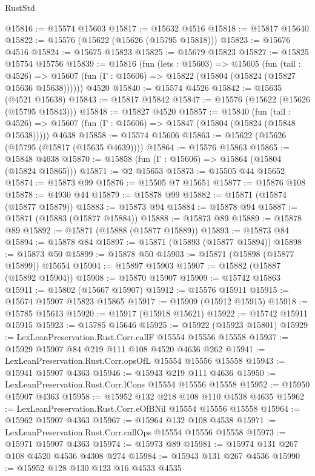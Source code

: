 \begin{lexlean}{RustStd}
\begin{coremodule}
@15816 := @15574 @15603
@15817 := @15632 @4516
@15818 := @15817 @15640
@15822 := @15576 (@15622 (@15626 (@15795 @15818)))
@15823 := @15676 @4516
@15824 := @15675 @15823
@15825 := @15679 @15823
@15827 := @15825 @15754 @15756
@15839 := @15816
    (fun (lets : @15603) =>
    @15605
      (fun (tail : @4526) =>
      @15607 (fun (Γ : @15606) => @15822 (@15804 (@15824 (@15827 @15636 @15638))))))
    @4520
@15840 := @15574 @4526
@15842 := @15635 (@4521 @15638)
@15843 := @15817 @15842
@15847 := @15576 (@15622 (@15626 (@15795 @15843)))
@15848 := @15827 @4520
@15857 := @15840
    (fun (tail : @4526) => @15607 (fun (Γ : @15606) => @15847 (@15804 (@15824 (@15848 @15638)))))
    @4638
@15858 := @15574 @15606
@15863 := @15622 (@15626 (@15795 (@15817 (@15635 @4639))))
@15864 := @15576 @15863
@15865 := @15848 @4638
@15870 := @15858 (fun (Γ : @15606) => @15864 (@15804 (@15824 @15865)))
@15871 := @2 @15653
@15873 := @15505 @44 @15652
@15874 := @15873 @99
@15876 := @15505 @7 @15651
@15877 := @15876 @108
@15878 := @4930 @44
@15879 := @15878 @99
@15882 := @15871 (@15874 (@15877 @15879))
@15883 := @15873 @94
@15884 := @15878 @94
@15887 := @15871 (@15883 (@15877 @15884))
@15888 := @15873 @89
@15889 := @15878 @89
@15892 := @15871 (@15888 (@15877 @15889))
@15893 := @15873 @84
@15894 := @15878 @84
@15897 := @15871 (@15893 (@15877 @15894))
@15898 := @15873 @50
@15899 := @15878 @50
@15903 := @15871 (@15898 (@15877 @15899)) @15654
@15904 := @15897 @15903
@15907 := @15882 (@15887 (@15892 @15904))
@15908 := @15870 @15907
@15909 := @15742 @15863
@15911 := @15802 (@15667 @15907)
@15912 := @15576 @15911
@15915 := @15674 @15907 @15823 @15865
@15917 := @15909 (@15912 @15915)
@15918 := @15785 @15613
@15920 := @15917 (@15918 @15621)
@15922 := @15742 @15911 @15915
@15923 := @15785 @15646
@15925 := @15922 (@15923 @15801)
@15929 := LexLeanPreservation.Rust.Corr.callF @15554 @15556 @15558
@15937 := @15929 @15907 @84 @219 @111 @108 @4520 @4636 @262
@15941 := LexLeanPreservation.Rust.Corr.opsOfL @15554 @15556 @15558
@15943 := @15941 @15907 @4363
@15946 := @15943 @219 @111 @4636
@15950 := LexLeanPreservation.Rust.Corr.lCons @15554 @15556 @15558
@15952 := @15950 @15907 @4363
@15958 := @15952 @132 @218 @108 @110 @4538 @4635
@15962 := LexLeanPreservation.Rust.Corr.eOfBNil @15554 @15556 @15558
@15964 := @15962 @15907 @4363
@15967 := @15964 @132 @108 @4538
@15971 := LexLeanPreservation.Rust.Corr.callOps @15554 @15556 @15558
@15973 := @15971 @15907 @4363
@15974 := @15973 @89
@15981 := @15974 @131 @267 @108 @4520 @4536 @4308 @274
@15984 := @15943 @131 @267 @4536
@15990 := @15952 @128 @130 @123 @16 @4533 @4535

\end{coremodule}
\end{lexlean}

